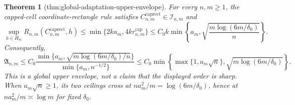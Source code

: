 \documentclass{article}
\newtheorem{theorem}{Theorem}
\begin{document}
\begin{theorem}[thm:global-adaptation-upper-envelope]\label{thm:global-adaptation-upper-envelope}
For every \(n,m\geq1\), the capped-cell coordinate-rectangle rule satisfies \(C^{\mathrm{caprect}}_{n,m}\in\mathcal I_{n,m}\) and
\[
 \sup_{h\in H_m}R_{n,m}(C^{\mathrm{caprect}}_{n,m},h)
 \leq \min\{2ka_m,4kr^{\mathrm{cap}}_{n,m}\}
 \leq C_0k\min\left\{a_m,\sqrt{\frac{m\log(6m/\delta_0)}{n}}\right\}.
\]
Consequently,
\[
 \mathfrak A_{n,m}
 \leq C_0\frac{\min\{a_m,\sqrt{m\log(6m/\delta_0)/n}\}}
 {\min\{a_m,n^{-1/2}\}}
 \leq C_0\min\left\{\max\{1,a_m\sqrt n\},\sqrt{m\log(6m/\delta_0)}\right\}.
\]
This is a global upper envelope, not a claim that the displayed order is sharp. When \(a_m\sqrt n\geq1\), its two ceilings cross at \(na_m^2/m=\log(6m/\delta_0)\), hence at \(na_m^2/m\asymp\log m\) for fixed \(\delta_0\).
\end{theorem}
\end{document}
